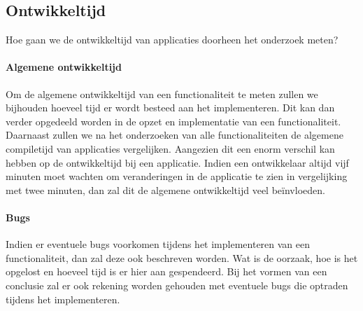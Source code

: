 \subsection{Ontwikkeltijd}
Hoe gaan we de ontwikkeltijd van applicaties doorheen het onderzoek meten?

\paragraph{Algemene ontwikkeltijd}
Om de algemene ontwikkeltijd van een functionaliteit te meten zullen we bijhouden hoeveel tijd er wordt 
besteed aan het implementeren. Dit kan dan verder opgedeeld worden in de opzet en implementatie van een functionaliteit. 
Daarnaast zullen we na het onderzoeken van alle functionaliteiten de algemene compiletijd van applicaties vergelijken. 
Aangezien dit een enorm verschil kan hebben op de ontwikkeltijd bij een applicatie. Indien een ontwikkelaar altijd 
vijf minuten moet wachten om veranderingen in de applicatie te zien in vergelijking met twee minuten, 
dan zal dit de algemene ontwikkeltijd veel beïnvloeden.

\paragraph{Bugs}
Indien er eventuele bugs voorkomen tijdens het implementeren van een functionaliteit, dan zal deze ook beschreven worden. 
Wat is de oorzaak, hoe is het opgelost en hoeveel tijd is er hier aan gespendeerd. Bij het vormen van een conclusie zal er ook 
rekening worden gehouden met eventuele bugs die optraden tijdens het implementeren.